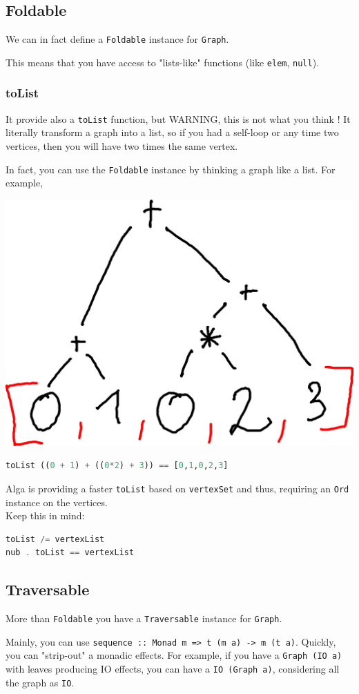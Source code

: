 \documentclass[10pt,a4paper]{article}
\begin{document}
\subsection{Foldable}
We can in fact define a \verb|Foldable| instance for \verb|Graph|.

This means that you have access to "lists-like" functions (like \verb|elem|, \verb|null|). 

\subsubsection{toList}
It provide also a \verb|toList| function, but WARNING, this is not what you think ! It literally transform a graph into a list, so if you had a self-loop or any time two vertices, then you will have two times the same vertex.

In fact, you can use the \verb|Foldable| instance by thinking a graph like a list. For example, 

\begin{center}
	\includegraphics[scale=0.5]{figspng/foldable.png}
\end{center}

\begin{lstlisting}[language=Haskell, frame=single]
toList ((0 + 1) + ((0*2) + 3)) == [0,1,0,2,3]
\end{lstlisting}

Alga is providing a faster \verb|toList| based on \verb|vertexSet| and thus, requiring an \verb|Ord| instance on the vertices.
\\
Keep this in mind:
\begin{lstlisting}[language=Haskell, frame=single]
toList /= vertexList
nub . toList == vertexList
\end{lstlisting}

\subsection{Traversable}
More than \verb|Foldable| you have a \verb|Traversable| instance for \verb|Graph|.

Mainly, you can use \verb|sequence :: Monad m => t (m a) -> m (t a)|. Quickly, you can "strip-out" a monadic effects. For example, if you have a \verb|Graph (IO a)| with leaves producing IO effects, you can have a \verb|IO (Graph a)|, considering all the graph as \verb|IO|.
\end{document}

